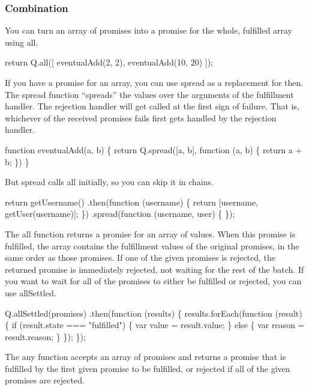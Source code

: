\subsubsection*{Combination}

You can turn an array of promises into a promise for the whole, fulfilled array using {\ttfamily all}.


\begin{DoxyCode}
return Q.all([
    eventualAdd(2, 2),
    eventualAdd(10, 20)
]);
\end{DoxyCode}


If you have a promise for an array, you can use {\ttfamily spread} as a replacement for {\ttfamily then}. The {\ttfamily spread} function “spreads” the values over the arguments of the fulfillment handler. The rejection handler will get called at the first sign of failure. That is, whichever of the received promises fails first gets handled by the rejection handler.


\begin{DoxyCode}
function eventualAdd(a, b) \{
    return Q.spread([a, b], function (a, b) \{
        return a + b;
    \})
\}
\end{DoxyCode}


But {\ttfamily spread} calls {\ttfamily all} initially, so you can skip it in chains.


\begin{DoxyCode}
return getUsername()
.then(function (username) \{
    return [username, getUser(username)];
\})
.spread(function (username, user) \{
\});
\end{DoxyCode}


The {\ttfamily all} function returns a promise for an array of values. When this promise is fulfilled, the array contains the fulfillment values of the original promises, in the same order as those promises. If one of the given promises is rejected, the returned promise is immediately rejected, not waiting for the rest of the batch. If you want to wait for all of the promises to either be fulfilled or rejected, you can use {\ttfamily all\+Settled}.


\begin{DoxyCode}
Q.allSettled(promises)
.then(function (results) \{
    results.forEach(function (result) \{
        if (result.state === "fulfilled") \{
            var value = result.value;
        \} else \{
            var reason = result.reason;
        \}
    \});
\});
\end{DoxyCode}


The {\ttfamily any} function accepts an array of promises and returns a promise that is fulfilled by the first given promise to be fulfilled, or rejected if all of the given promises are rejected.


